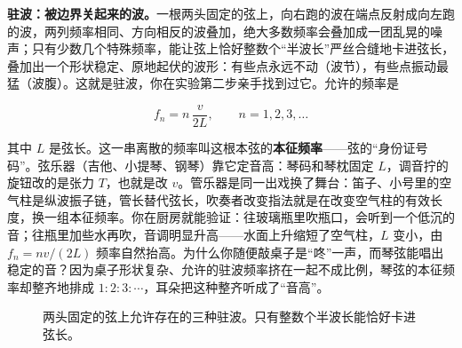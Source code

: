 \begin{mainline}
\textbf{驻波：被边界关起来的波。}一根两头固定的弦上，向右跑的波在端点反射成向左跑的波，两列频率相同、方向相反的波叠加，绝大多数频率会叠加成一团乱晃的噪声；只有少数几个特殊频率，能让弦上恰好整数个“半波长”严丝合缝地卡进弦长，叠加出一个形状稳定、原地起伏的波形：有些点永远不动（波节），有些点振动最猛（波腹）。这就是驻波，你在实验第二步亲手找到过它。允许的频率是

\[
  f_n = n\,\frac{v}{2L}, \qquad n=1,2,3,\dots
\]

其中 \(L\) 是弦长。这一串离散的频率叫这根本弦的\textbf{本征频率}——弦的“身份证号码”。弦乐器（吉他、小提琴、钢琴）靠它定音高：琴码和琴枕固定 \(L\)，调音拧的旋钮改的是张力 \(T\)，也就是改 \(v\)。管乐器是同一出戏换了舞台：笛子、小号里的空气柱是纵波振子链，管长替代弦长，吹奏者改变指法就是在改变空气柱的有效长度，换一组本征频率。你在厨房就能验证：往玻璃瓶里吹瓶口，会听到一个低沉的音；往瓶里加些水再吹，音调明显升高——水面上升缩短了空气柱，\(L\) 变小，由 \(f_n = nv/(2L)\) 频率自然抬高。为什么你随便敲桌子是“咚”一声，而琴弦能唱出稳定的音？因为桌子形状复杂、允许的驻波频率挤在一起不成比例，琴弦的本征频率却整齐地排成 \(1:2:3:\cdots\)，耳朵把这种整齐听成了“音高”。
\end{mainline}

\begin{figure}[htbp]
\centering
{}
\caption{两头固定的弦上允许存在的三种驻波。只有整数个半波长能恰好卡进弦长。}
\end{figure}


